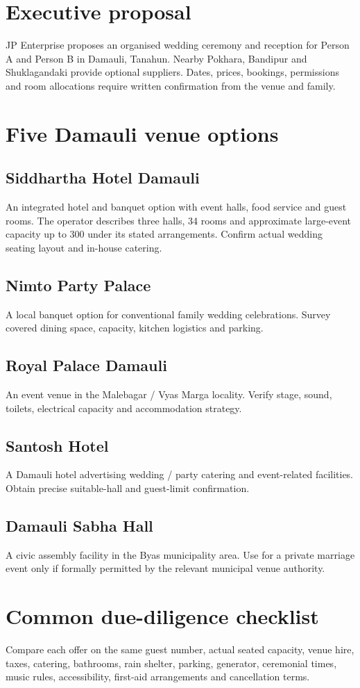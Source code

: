 \section{Executive proposal}
JP Enterprise proposes an organised wedding ceremony and reception for Person A and Person B in Damauli, Tanahun. Nearby Pokhara, Bandipur and Shuklagandaki provide optional suppliers. Dates, prices, bookings, permissions and room allocations require written confirmation from the venue and family.

\section{Five Damauli venue options}
\subsection{Siddhartha Hotel Damauli}
An integrated hotel and banquet option with event halls, food service and guest rooms. The operator describes three halls, 34 rooms and approximate large-event capacity up to 300 under its stated arrangements. Confirm actual wedding seating layout and in-house catering.

\subsection{Nimto Party Palace}
A local banquet option for conventional family wedding celebrations. Survey covered dining space, capacity, kitchen logistics and parking.

\subsection{Royal Palace Damauli}
An event venue in the Malebagar / Vyas Marga locality. Verify stage, sound, toilets, electrical capacity and accommodation strategy.

\subsection{Santosh Hotel}
A Damauli hotel advertising wedding / party catering and event-related facilities. Obtain precise suitable-hall and guest-limit confirmation.

\subsection{Damauli Sabha Hall}
A civic assembly facility in the Byas municipality area. Use for a private marriage event only if formally permitted by the relevant municipal venue authority.

\section{Common due-diligence checklist}
Compare each offer on the same guest number, actual seated capacity, venue hire, taxes, catering, bathrooms, rain shelter, parking, generator, ceremonial times, music rules, accessibility, first-aid arrangements and cancellation terms.
